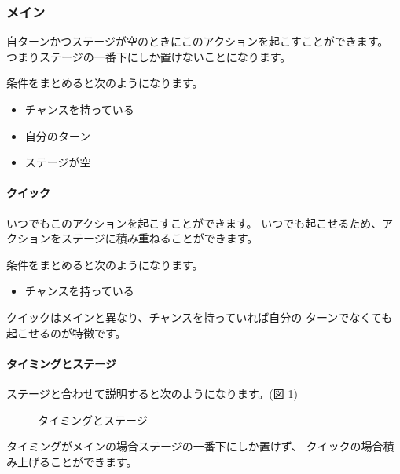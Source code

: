\documentclass[letterpaper,10pt,dvipdfmx]{sphinxmanual}
\begin{document}
\subsubsection{メイン}
\label{\detokenize{common/03-action:id22}}
自ターンかつステージが空のときにこのアクションを起こすことができます。
つまりステージの一番下にしか置けないことになります。

条件をまとめると次のようになります。
\begin{itemize}
\item {} 
チャンスを持っている

\item {} 
自分のターン

\item {} 
ステージが空

\end{itemize}


\paragraph{クイック}
\label{\detokenize{common/03-action:id23}}
いつでもこのアクションを起こすことができます。
いつでも起こせるため、アクションをステージに積み重ねることができます。

条件をまとめると次のようになります。
\begin{itemize}
\item {} 
チャンスを持っている

\end{itemize}

クイックはメインと異なり、チャンスを持っていれば自分の
ターンでなくても起こせるのが特徴です。


\paragraph{タイミングとステージ}
\label{\detokenize{common/03-action:id24}}
ステージと合わせて説明すると次のようになります。(\hyperref[\detokenize{common/03-action:timing}]{図 \ref{\detokenize{common/03-action:timing}}})

\begin{figure}[htbp]
\centering
\capstart

\noindent{}
\caption{タイミングとステージ}\label{\detokenize{common/03-action:id36}}\label{\detokenize{common/03-action:timing}}\end{figure}

タイミングがメインの場合ステージの一番下にしか置けず、
クイックの場合積み上げることができます。
\end{document}
